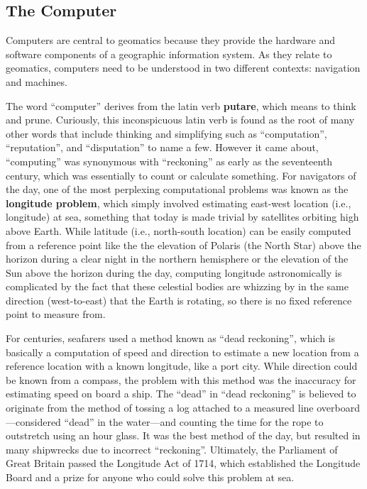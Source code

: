\documentclass[
]{book}
\begin{document}
\hypertarget{the-computer}{%
\subsection{The Computer}\label{the-computer}}

Computers are central to geomatics because they provide the hardware and software components of a geographic information system. As they relate to geomatics, computers need to be understood in two different contexts: navigation and machines.

The word ``computer'' derives from the latin verb \textbf{putare}, which means to think and prune. Curiously, this inconspicuous latin verb is found as the root of many other words that include thinking and simplifying such as ``computation'', ``reputation'', and ``disputation'' to name a few. However it came about, ``computing'' was synonymous with ``reckoning'' as early as the seventeenth century, which was essentially to count or calculate something. For navigators of the day, one of the most perplexing computational problems was known as the \textbf{longitude problem}, which simply involved estimating east-west location (i.e., longitude) at sea, something that today is made trivial by satellites orbiting high above Earth. While latitude (i.e., north-south location) can be easily computed from a reference point like the the elevation of Polaris (the North Star) above the horizon during a clear night in the northern hemisphere or the elevation of the Sun above the horizon during the day, computing longitude astronomically is complicated by the fact that these celestial bodies are whizzing by in the same direction (west-to-east) that the Earth is rotating, so there is no fixed reference point to measure from.

For centuries, seafarers used a method known as ``dead reckoning'', which is basically a computation of speed and direction to estimate a new location from a reference location with a known longitude, like a port city. While direction could be known from a compass, the problem with this method was the inaccuracy for estimating speed on board a ship. The ``dead'' in ``dead reckoning'' is believed to originate from the method of tossing a log attached to a measured line overboard---considered ``dead'' in the water---and counting the time for the rope to outstretch using an hour glass. It was the best method of the day, but resulted in many shipwrecks due to incorrect ``reckoning''. Ultimately, the Parliament of Great Britain passed the Longitude Act of 1714, which established the Longitude Board and a prize for anyone who could solve this problem at sea.
\end{document}
